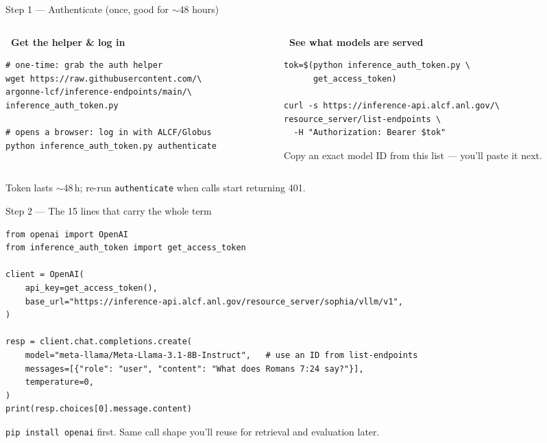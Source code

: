 \begin{frame}[fragile]{Step 1 --- Authenticate (once, good for $\sim$48 hours)}
  \begin{columns}[t, totalwidth=\textwidth]
    \begin{column}{0.52\textwidth}
      {\footnotesize\bfseries\color{accentblue}\faKey\ Get the helper \& log in}
      \begin{lstlisting}[style=shell]
# one-time: grab the auth helper
wget https://raw.githubusercontent.com/\
argonne-lcf/inference-endpoints/main/\
inference_auth_token.py

# opens a browser: log in with ALCF/Globus
python inference_auth_token.py authenticate
      \end{lstlisting}
    \end{column}
    \begin{column}{0.48\textwidth}
      {\footnotesize\bfseries\color{cRAG}\faList\ See what models are served}
      \begin{lstlisting}[style=shell]
tok=$(python inference_auth_token.py \
      get_access_token)

curl -s https://inference-api.alcf.anl.gov/\
resource_server/list-endpoints \
  -H "Authorization: Bearer $tok"
      \end{lstlisting}
      {\scriptsize\color{midgray}Copy an exact model ID from this list --- you'll paste it next.}
    \end{column}
  \end{columns}
  \vspace{6pt}
  \begin{center}\footnotesize\color{midgray}%
    Token lasts $\sim$48\,h; re-run \texttt{authenticate} when calls start returning 401.\end{center}
\end{frame}

\begin{frame}[fragile]{Step 2 --- The 15 lines that carry the whole term}
  \begin{lstlisting}[style=shell, title=Python (OpenAI-compatible client)]
from openai import OpenAI
from inference_auth_token import get_access_token

client = OpenAI(
    api_key=get_access_token(),
    base_url="https://inference-api.alcf.anl.gov/resource_server/sophia/vllm/v1",
)

resp = client.chat.completions.create(
    model="meta-llama/Meta-Llama-3.1-8B-Instruct",   # use an ID from list-endpoints
    messages=[{"role": "user", "content": "What does Romans 7:24 say?"}],
    temperature=0,
)
print(resp.choices[0].message.content)
  \end{lstlisting}
  \begin{center}\footnotesize\color{midgray}%
    \texttt{pip install openai} first. Same call shape you'll reuse for retrieval and evaluation later.\end{center}
\end{frame}

